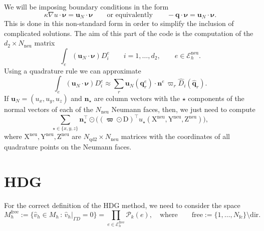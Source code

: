 \documentclass[10pt,english]{article}
\newcommand{\Nndb}{{N_{\mathrm{qd2}}}}
\newcommand{\Nfc}{{N_{\mathrm{fc}}}}
\newcommand{\Nneu}{{N_{\mathrm{neu}}}}
\newcommand{\dir}{{\mathrm{dir}}}
\newcommand{\neu}{{\mathrm{neu}}}
\newcommand{\free}{{\mathrm{free}}}
\newcommand{\qq}{\widehat{\mathbf q}}
\begin{document}
We will be imposing boundary conditions in the form
\[
\kappa\nabla u\cdot\boldsymbol\nu=\boldsymbol u_N\cdot\boldsymbol\nu \qquad \mbox{or equivalently} \qquad -\boldsymbol q\cdot\boldsymbol\nu=\boldsymbol u_N\cdot \boldsymbol\nu.
\]
This is done in this non-standard form in order to simplify the inclusion of complicated solutions. The aim of this part of the code is the computation of the $d_2\times \Nneu$ matrix
\[
\int_e (\boldsymbol u_N\cdot \boldsymbol\nu) D_i^e \qquad i=1,\ldots,d_2, \qquad e\in \mathcal E_h^\neu.
\]
Using a quadrature rule we can approximate
\[
\int_e (\boldsymbol u_N\cdot \boldsymbol\nu) D_i^e \approx  \sum_r \boldsymbol u_N(\mathbf q_r^e)\cdot\mathbf n^e\, \varpi_r \widehat D_i(\qq_r).
\]
If $\boldsymbol u_N=(u_x,u_y,u_z)$ and $\mathbf n_\star$ are column vectors with the $\star$ components of the normal vectors of each of the $\Nneu$ Neumann faces, then, we just need to compute
\[
\sum_{\star\in \{x,y,z\}} \mathbf n_\star^\top \odot \big( (\boldsymbol\varpi\odot\mathrm D)^\top u_\star(\mathrm X^\neu,\mathrm Y^\neu,\mathrm Z^\neu)\big),
\]
where $\mathrm X^\neu, \mathrm Y^\neu,\mathrm Z^\neu$ are $\Nndb \times \Nneu$ matrices with the coordinates of all quadrature points on the Neumann faces.





\section{HDG}

For the correct definition of the HDG method, we need to consider the space
\[
M_h^\free:=\{ \widehat v_h \in M_h \,:\, \widehat v_h|_{\Gamma D}=0\} = \prod_{e\in \mathcal E_h^\free} \mathcal P_k(e), \quad\mbox{where} \qquad \free:=\{1,\ldots,\Nfc\} \setminus \dir.
\]
\end{document}
